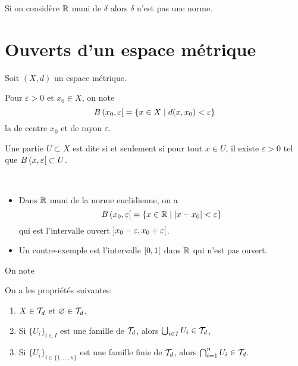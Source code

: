 \begin{remark}
    Si on considère \(\mathbb{R}\) muni de \(\delta\) alors \(\delta\) n'est pas une norme.
\end{remark}

\section{Ouverts d'un espace métrique}\label{sec:ouverts-dun-espace-metrique}

Soit \((X, d)\) un espace métrique.

\begin{definition}
    Pour \(\varepsilon > 0\) et \(x_0\in X\), on note
    \begin{equation*}
        B\left({x_0}, {\varepsilon}\mathopen{}\right[\mathclose{} = \{x \in X \mid d(x, x_0) < \varepsilon\}
    \end{equation*}
    la  de centre \(x_0\) et de rayon \(\varepsilon\).
\end{definition}

\begin{definition}
    Une partie \(U \subset X\) est dite  si et seulement si
    pour tout \(x \in U\), il existe \(\varepsilon > 0\) tel que \(B\left({x}, {\varepsilon}\mathopen{}\right[\mathclose{} \subset U\).
\end{definition}

\begin{example}\,
    \begin{itemize}
        \item Dans \(\mathbb{R}\) muni de la norme euclidienne, on a
        \begin{equation*}
            B\left({x_0}, {\varepsilon}\mathopen{}\right[\mathclose{} = \{ x \in \mathbb{R} \mid \left\lvert x - x_0\right\rvert < \varepsilon \}
        \end{equation*}
        qui est l'intervalle ouvert \(\mathopen{}\left]x_0 - \varepsilon, x_0 + \varepsilon\right[\mathclose{}\).

        \item Un contre-exemple est l'intervalle \(\mathopen{}\left[0, 1\right[\mathclose{}\) dans \(\mathbb{R}\) qui n'est pas ouvert.
    \end{itemize}
\end{example}

\begin{definition}
    On note 
\end{definition}

\begin{proposition}
    On a les propriétés suivantes:
    \begin{enumerate}[label=(\roman*)]
        \item \(X \in \mathcal{T}_d\) et \(\varnothing \in \mathcal{T}_d\),
        \item Si \({\{U_i\}}_{i \in I}\) est une famille de \(\mathcal{T}_d\), alors \(\bigcup_{i \in I} U_i \in \mathcal{T}_d\),
        \item Si  \({\{U_i\}}_{i \in \{1, \ldots, n\}}\) est une famille finie de \(\mathcal{T}_d\), alors \(\bigcap_{i = 1}^n U_i \in \mathcal{T}_d\).
    \end{enumerate}
\end{proposition}

